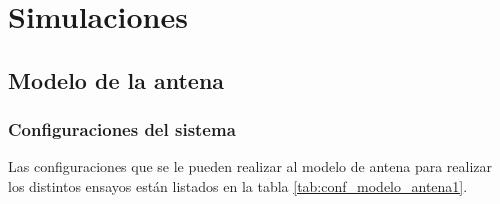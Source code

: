 \chapter{Simulaciones}

\section{Modelo de la antena}




\subsection{Configuraciones del sistema}

Las configuraciones que se le pueden realizar al modelo de antena para realizar los distintos ensayos están listados en la 
tabla \ref{tab:conf_modelo_antena1}.

